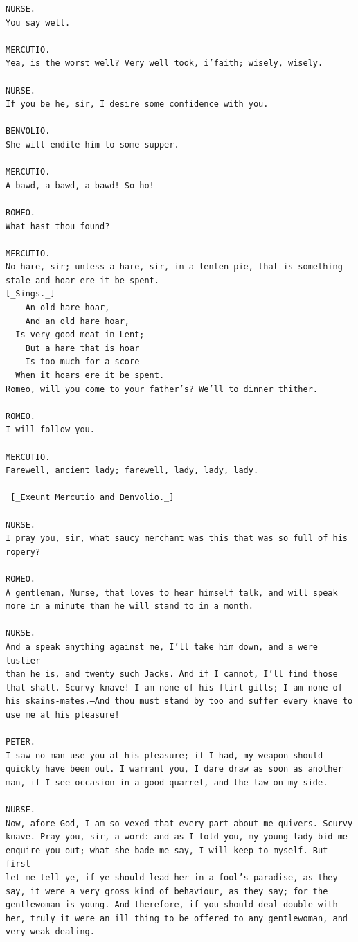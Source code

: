 \documentclass{article}
\begin{document}
\begin{verbatim}
NURSE.
You say well.

MERCUTIO.
Yea, is the worst well? Very well took, i’faith; wisely, wisely.

NURSE.
If you be he, sir, I desire some confidence with you.

BENVOLIO.
She will endite him to some supper.

MERCUTIO.
A bawd, a bawd, a bawd! So ho!

ROMEO.
What hast thou found?

MERCUTIO.
No hare, sir; unless a hare, sir, in a lenten pie, that is something
stale and hoar ere it be spent.
[_Sings._]
    An old hare hoar,
    And an old hare hoar,
  Is very good meat in Lent;
    But a hare that is hoar
    Is too much for a score
  When it hoars ere it be spent.
Romeo, will you come to your father’s? We’ll to dinner thither.

ROMEO.
I will follow you.

MERCUTIO.
Farewell, ancient lady; farewell, lady, lady, lady.

 [_Exeunt Mercutio and Benvolio._]

NURSE.
I pray you, sir, what saucy merchant was this that was so full of his
ropery?

ROMEO.
A gentleman, Nurse, that loves to hear himself talk, and will speak
more in a minute than he will stand to in a month.

NURSE.
And a speak anything against me, I’ll take him down, and a were lustier
than he is, and twenty such Jacks. And if I cannot, I’ll find those
that shall. Scurvy knave! I am none of his flirt-gills; I am none of
his skains-mates.—And thou must stand by too and suffer every knave to
use me at his pleasure!

PETER.
I saw no man use you at his pleasure; if I had, my weapon should
quickly have been out. I warrant you, I dare draw as soon as another
man, if I see occasion in a good quarrel, and the law on my side.

NURSE.
Now, afore God, I am so vexed that every part about me quivers. Scurvy
knave. Pray you, sir, a word: and as I told you, my young lady bid me
enquire you out; what she bade me say, I will keep to myself. But first
let me tell ye, if ye should lead her in a fool’s paradise, as they
say, it were a very gross kind of behaviour, as they say; for the
gentlewoman is young. And therefore, if you should deal double with
her, truly it were an ill thing to be offered to any gentlewoman, and
very weak dealing.


\end{verbatim}
\end{document}
